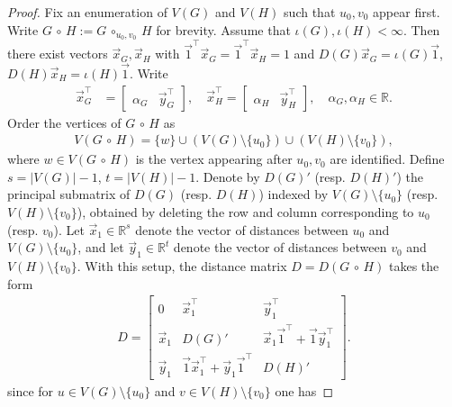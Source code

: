 \documentclass[11pt,a4paper]{article}
\newcommand{\distmatrix}{D}
\newcommand{\x}{\vec{x}}
\newcommand{\y}{\vec{y}}
\newcommand{\one}{\vec{1}}
\newcommand{\Circ}{\circ}
\begin{document}
    \begin{proof}
        Fix an enumeration of $V(G)$ and $V(H)$ such that $u_0, v_0$ appear first. Write $G\,\Circ\, H := G\,\Circ_{u_{0},v_{0}}\,H$ for brevity. Assume that $\iota(G),\iota(H)<\infty$. Then there exist vectors $\x_G,\x_H$ with $\one^\top\x_G = \one^\top\x_H = 1$ and $\distmatrix(G)\x_G = \iota(G)\one$, $\distmatrix(H)\x_H = \iota(H)\one$. Write
            \begin{align*}
                \x_G^\top &= \begin{bmatrix}
                    \alpha_G & \y_G^\top
                \end{bmatrix},\quad \x_H^\top = \begin{bmatrix}
                    \alpha_H & \y_H^\top
                \end{bmatrix}, \quad \alpha_G,\alpha_H\in\mathbb{R}.
            \end{align*}
        Order the vertices of $G\,\Circ\,H$ as
            \begin{align*}
                V(G\,\Circ\,H) = \{w\} \cup (V(G)\setminus \{u_{0}\} )\cup (V(H)\setminus \{v_{0}\}),
            \end{align*}
        where $w\in V(G\,\Circ\,H)$ is the vertex appearing after $u_0, v_0$ are identified. Define $s = |V(G)| - 1$, $t = |V(H)| - 1$. Denote by ${\distmatrix(G)}'$ (resp. ${\distmatrix(H)}'$) the principal submatrix of ${\distmatrix(G)}$ (resp. ${\distmatrix(H)}$) indexed by $V(G)\setminus \{u_{0}\}$ (resp. $V(H)\setminus \{v_{0}\}$), obtained by deleting the row and column corresponding to $u_{0}$ (resp. $v_{0}$). Let $\x_{1}\in\mathbb{R}^{s}$ denote the vector of distances between $u_{0}$ and $V(G)\setminus \{u_{0}\}$, and let $\y_{1}\in\mathbb{R}^{t}$ denote the vector of distances between $v_{0}$ and $V(H)\setminus \{v_{0}\}$. With this setup, the distance matrix $\distmatrix = \distmatrix(G\,\Circ\,H)$ takes the form
            \begin{align}\label{eq:d-decomp}
                \distmatrix = \begin{bmatrix}
                    0 & \x_{1}^\top & \y_{1}^\top\\
                    \x_{1} & {\distmatrix(G)}' & \x_{1}\one^\top + \one \y_{1}^\top\\
                    \y_{1} & \one \x_{1}^\top + \y_{1}\one^\top & {\distmatrix(H)}'
                \end{bmatrix}.
            \end{align}
        since for $u\in V(G)\setminus\{u_{0}\}$ and $v\in V(H)\setminus\{v_{0}\}$ one has

\end{proof}
\end{document}
